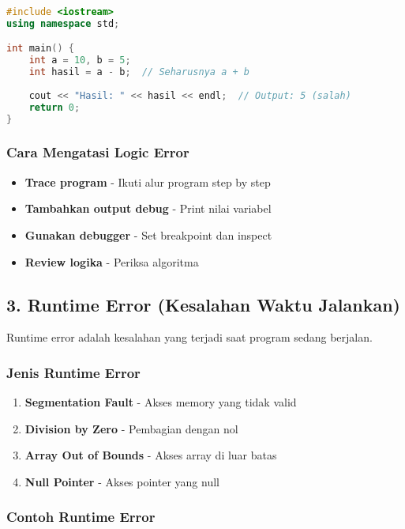 \begin{lstlisting}[language=c++, caption=Contoh Logic Error]
#include <iostream>
using namespace std;

int main() {
    int a = 10, b = 5;
    int hasil = a - b;  // Seharusnya a + b
    
    cout << "Hasil: " << hasil << endl;  // Output: 5 (salah)
    return 0;
}
\end{lstlisting}

\subsubsection{Cara Mengatasi Logic Error}

\begin{itemize}
\item \textbf{Trace program} - Ikuti alur program step by step
\item \textbf{Tambahkan output debug} - Print nilai variabel
\item \textbf{Gunakan debugger} - Set breakpoint dan inspect
\item \textbf{Review logika} - Periksa algoritma
\end{itemize}

\subsection{3. Runtime Error (Kesalahan Waktu Jalankan)}

Runtime error adalah kesalahan yang terjadi saat program sedang berjalan.

\subsubsection{Jenis Runtime Error}

\begin{enumerate}
\item \textbf{Segmentation Fault} - Akses memory yang tidak valid
\item \textbf{Division by Zero} - Pembagian dengan nol
\item \textbf{Array Out of Bounds} - Akses array di luar batas
\item \textbf{Null Pointer} - Akses pointer yang null
\end{enumerate}

\subsubsection{Contoh Runtime Error}

